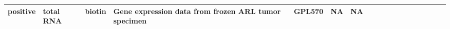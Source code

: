 \documentclass[]{article}
\begin{document}
\begin{longtable}[]{@{}lllllllrllllllllll@{}}
\begin{minipage}[t]{0.04\columnwidth}
positive\strut
\end{minipage} & \begin{minipage}[t]{0.02\columnwidth}\raggedright
total RNA\strut
\end{minipage} & \begin{minipage}[t]{0.01\columnwidth}\raggedright
biotin\strut
\end{minipage} & \begin{minipage}[t]{0.08\columnwidth}\raggedright
Gene expression data from frozen ARL tumor specimen\strut
\end{minipage} & \begin{minipage}[t]{0.01\columnwidth}\raggedright
GPL570\strut
\end{minipage} & \begin{minipage}[t]{0.00\columnwidth}\raggedright
NA\strut
\end{minipage} & \begin{minipage}[t]{0.01\columnwidth}\raggedright
NA\strut
\end{minipage}\tabularnewline
\bottomrule
\end{longtable}
\end{document}
